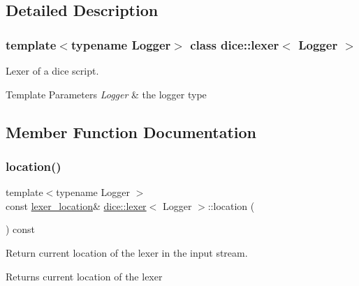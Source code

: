 \subsection{Detailed Description}
\subsubsection*{template$<$typename Logger$>$\newline
class dice\+::lexer$<$ Logger $>$}

Lexer of a dice script. 


\begin{DoxyTemplParams}{Template Parameters}
{\em Logger} & the logger type \\
\hline
\end{DoxyTemplParams}


\subsection{Member Function Documentation}
\mbox{\label{classdice_1_1lexer_a1e62241846b4736d744fe9bb61385cc3}} 
\subsubsection{\texorpdfstring{location()}{location()}}
{\footnotesize\ttfamily template$<$typename Logger $>$ \\
const \mbox{\hyperlink{structdice_1_1lexer__location}{lexer\+\_\+location}}\& \mbox{\hyperlink{classdice_1_1lexer}{dice\+::lexer}}$<$ Logger $>$\+::location (\begin{DoxyParamCaption}{ }\end{DoxyParamCaption}) const\hspace{0.3cm}{\ttfamily [inline]}}



Return current location of the lexer in the input stream. 

\begin{DoxyReturn}{Returns}
current location of the lexer 
\end{DoxyReturn}
\mbox{\label{classdice_1_1lexer_a7dd396caa4bfcd3416569eb1be07ecdd}} 
